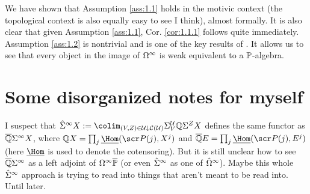 \documentclass{amsart}
\theoremstyle{definition}
\begin{document}
We have shown that Assumption \ref{ass:1.1} holds in the motivic context (the topological context is also equally easy to see I think), almost formally. It is also clear that given Assumption \ref{ass:1.1}, Cor. \ref{cor:1.1.1} follows quite immediately. Assumption \ref{ass:1.2} is nontrivial and is one of the key results of \cite{Barratt1974oper, Barratt1974oper2}. It allows us to see that every object in the image of $\Omega^{\infty}$ is weak equivalent to a $\mathbb{P}$-algebra. 

\section{Some disorganized notes for myself}
I suspect that $\hat{\SI}^{\infty}X := \colim_{(V,Z) \in \oU \downarrow \oC(\oU)} \SI^{\oU}_{V} \bQ \SI^Z X$ defines the same functor as $\overline{\mathbb{Q}}\Sigma^{\infty} X$, where $\bQ X = \prod_j \ul{\Hom} (\sP(j),X^j)$ and $\ol{\bQ} E = \prod_j \ul{\Hom}(\sP(j),E^j)$ (here $\ul{\Hom}$ is used to denote the cotensoring). But it is still unclear how to see $\overline{\mathbb{Q}}\Sigma^{\infty}$ as a left adjoint of $\Omega^{\infty} \overline{\mathbb{P}}$ (or even $\hat{\Sigma}^{\infty}$ as one of $\hat{\Omega}^{\infty}$). Maybe this whole $\hat{\Sigma}^{\infty}$ approach is trying to read into things that aren't meant to be read into. Until later.
\printbibliography
\end{document}
